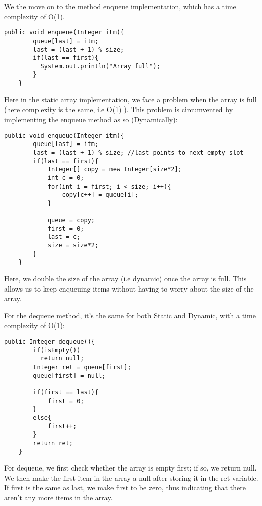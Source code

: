 \documentclass[a4paper,11pt]{article}
\begin{document}
We the move on to the method enqueue implementation, which has a time complexity of O(1).

\begin{verbatim}
public void enqueue(Integer itm){
        queue[last] = itm;
        last = (last + 1) % size;
        if(last == first){
          System.out.println("Array full");
        }
    } 
\end{verbatim}

Here in the static array implementation, we face a problem when the array is full (here complexity is the same, i.e O(1) ). This problem is circumvented by implementing the enqueue method as so (Dynamically):

\begin{verbatim}
public void enqueue(Integer itm){
        queue[last] = itm;
        last = (last + 1) % size; //last points to next empty slot
        if(last == first){
            Integer[] copy = new Integer[size*2];
            int c = 0;
            for(int i = first; i < size; i++){
                copy[c++] = queue[i];
            }

            queue = copy;
            first = 0;
            last = c;
            size = size*2;
        }
    }
\end{verbatim}

Here, we double the size of the array (i.e dynamic) once the array is full. This allows us to keep enqueuing items without having to worry about the size of the array. 

For the dequeue method, it's the same for both Static and Dynamic, with a time complexity of O(1):

\begin{verbatim}
public Integer dequeue(){
        if(isEmpty())
          return null;
        Integer ret = queue[first];
        queue[first] = null;

        if(first == last){
            first = 0;
        }
        else{
            first++;
        }
        return ret;
    }
\end{verbatim}

For dequeue, we first check whether the array is empty first; if so, we return null. We then make the first item in the array a null after storing it in the ret variable. If first is the same as last, we make first to be zero, thus indicating that there aren't any more items in the array.
\end{document}
